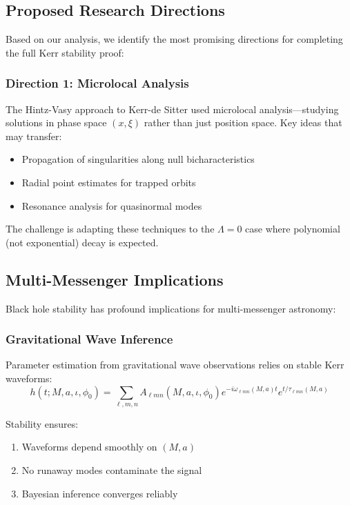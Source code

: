 \documentclass[12pt,a4paper]{article}
\begin{document}
\subsection{Proposed Research Directions}

Based on our analysis, we identify the most promising directions for completing the full Kerr stability proof:

\subsubsection{Direction 1: Microlocal Analysis}

The Hintz-Vasy approach to Kerr-de Sitter used microlocal analysis---studying solutions in phase space $(x, \xi)$ rather than just position space. Key ideas that may transfer:
\begin{itemize}
    \item Propagation of singularities along null bicharacteristics
    \item Radial point estimates for trapped orbits
    \item Resonance analysis for quasinormal modes
\end{itemize}

The challenge is adapting these techniques to the $\Lambda = 0$ case where polynomial (not exponential) decay is expected.

\subsection{Multi-Messenger Implications}

Black hole stability has profound implications for multi-messenger astronomy:

\subsubsection{Gravitational Wave Inference}

Parameter estimation from gravitational wave observations relies on stable Kerr waveforms:
\begin{equation}
h(t; M, a, \iota, \phi_0) = \sum_{\ell, m, n} A_{\ell mn}(M, a, \iota, \phi_0) e^{-i\omega_{\ell mn}(M, a) t} e^{t/\tau_{\ell mn}(M, a)}
\end{equation}

Stability ensures:
\begin{enumerate}
    \item Waveforms depend smoothly on $(M, a)$
    \item No runaway modes contaminate the signal
    \item Bayesian inference converges reliably
\end{enumerate}
\end{document}
